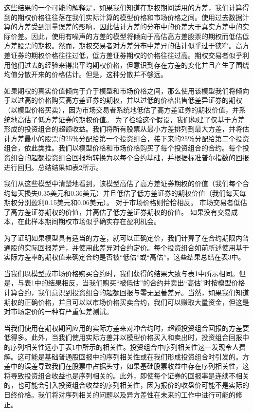 \par{这些结果的一个可能的解释是，如果我们知道在期权期间适用的方差，我们计算得到的期权价格往往落在我们实际计算的模型价格和市场价格之间。使用过去数据计算的方差受到测量误差的影响，因此估计方差的分布中的价差大于真实方差中的实际价差。因此，使用有噪声的方差的模型将倾向于高估高方差股票的期权而低估低方差股票的期权。然而，期权交易者对方差分布中差异的估计似乎过于狭窄。高方差证券的期权价格往往过低，低方差证券期权的价格往往过高。期权交易者似乎利用他们过去的经验来得出平均期权价格，但意识到存在方差的变化并且产生了围绕均值分散开来的价格估计。但是，这种分散并不够远。}
\par{
    如果期权的真实价值倾向于介于模型和市场价格之间，那么使用该模型我们将倾向于以过高的价格购买高方差证券的期权，并以过低的价格出售低差异证券的期权（以模型价格买卖），因为市场交易者系统地低估了高方差证券的期权价值，并系统地高估了低方差证券的期权价值。 为了检验这个假设，我们构建了仅基于方差形成的投资组合的超额收益。我们将所有股票从最小方差排列到最大方差，并将估计方差最小的股票的25％分配给第一个投资组合，接下来的25％分配给第二个投资组合，依此类推。我们以模型价格和市场价格购买了每个投资组合的合约。每个投资组合的超额投资组合回报均转换为以每个合约基础，并根据标准普尔指数的回报进行回归。总结结果如表2所示。
}
\par{
    我们从这些模型中清楚地看到，该模型高估了高方差证券期权的价值（我们每个合约每天损失0.35美元和0.36美元）并且低估了低方差证券的期权价值（我们每天每期权分别盈利0.15美元和0.06美元）。 对于市场价格则恰恰相反。 市场交易者低估了高方差证券期权的价值，并高估了低方差证券期权的价值。 如果没有交易成本，在此样本期间期权市场似乎确实存在盈利机会。
}
\par{为了证明如果模型具有适当的方差，就可以正确定价，我们计算了在合约期限内普通股的实际回报差异，并使用此差异对合约定价。每个投资组合如前所述使用基于实际方差率的期权值来确定合约是否被“低估”或“高估”。这些结果总结在表3中。}
\par{
当我们以模型或市场价格购买合约时，我们获得的结果大致与表1中所示相同。但是，与表1中的结果相反，当我们购买“被低估”的合约并卖出“高估”时按模型价格计算合约，我们意识到投资组合的超额回报与零无显著差异。当然，如果我们知道期权的正确价格，并且可以以市场价格买卖合约，我们可以赚取大量资金，但这是对市场定价的一种有严重偏差测试。}
\par{
    当我们使用在期权期间应用的实际方差来对冲合约时，超额投资组合回报的方差要低得多。此外，当我们使用实际方差并以模型价格买入和卖出时，投资组合回报中的序列相关性远小于表1中所示的相关性。投资组合中序列相关性这一发现令人费解。这可能是基础普通股回报中的序列相关性或在我们形成投资组合时引发的。方差中的误差导致我们在股票中占据头寸，如果基础股票收益中存在序列相关性，这将导致投资组合收益也是序列相关的。此外，即使每个证券的回报率是连续不相关的，也可能会引入投资组合收益的序列相关性，因为报价的收盘价可能不是实际的日终价格。我们将对序列相关的问题以及异方差性在未来的工作中进行可能的修正。

}
